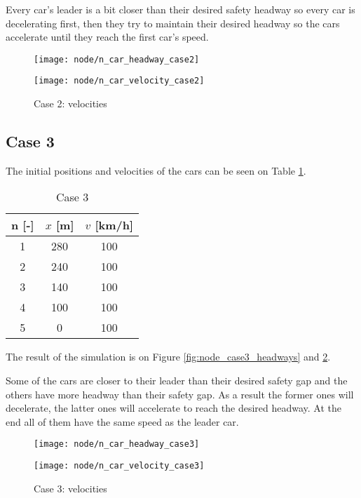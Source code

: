 		Every car's leader is a bit closer than their desired safety headway so every car is decelerating first, then they try to maintain their desired headway so the cars accelerate until they reach the first car's speed.
		\begin{figure}
			\centering
			\begin{minipage}{.5\textwidth}
				\centering
				\texttt{[image: node/n\_car\_headway\_case2]}
				\caption{Case 2: headways}
				\label{fig:node_case2_headways}
			\end{minipage}\hfill
			\begin{minipage}{.5\textwidth}
				\centering
				\texttt{[image: node/n\_car\_velocity\_case2]}
				\caption{Case 2: velocities}
				\label{fig:node_case2_velocities}
			\end{minipage}
		\end{figure}
		\subsection*{Case 3}
		The initial positions and velocities of the cars can be seen on Table \ref{tab:node_case3}.
		\begin{table}
			\centering
			\begin{tabular}{ |c|c|c| }
				\hline
				n [-] & $x$ [m] & $v$ [km/h]\\
				\hline
				1 &  280 & 100 \\
				2 & 240 & 100 \\
				3 & 140 & 100 \\
				4 & 100 & 100 \\
				5 & 0 & 100 \\
				\hline
			\end{tabular}
			\caption{Case 3}
			\label{tab:node_case3}
		\end{table}
		The result of the simulation is on  Figure \ref{fig:node_case3_headways} and \ref{fig:node_case3_velocities}. 

		Some of the cars are closer to their leader than their desired safety gap and the others have more headway than their safety gap. As a result the former ones will decelerate, the latter ones will accelerate to reach the desired headway. At the end all of them have the same speed as the leader car.
		\begin{figure}
			\centering
			\begin{minipage}{.5\textwidth}
				\centering
				\texttt{[image: node/n\_car\_headway\_case3]}
				\caption{Case 3: headways}
				\label{fig:node_case3_headways}
			\end{minipage}\hfill
			\begin{minipage}{.5\textwidth}
				\centering
				\texttt{[image: node/n\_car\_velocity\_case3]}
				\caption{Case 3: velocities}
				\label{fig:node_case3_velocities}
			\end{minipage}
		\end{figure}

